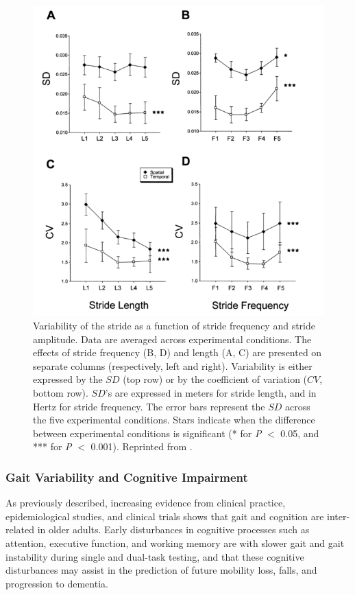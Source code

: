 \documentclass[11pt, oneside]{report}
\begin{document}
\begin{figure}[H]
  \centering
    \includegraphics[scale=0.7]{temp_spat_variability}
  \caption{Variability of the stride as a function of stride frequency and stride amplitude. Data are averaged across experimental conditions. The effects of stride frequency (B, D) and length (A, C) are presented on separate columns (respectively, left and right). Variability is either expressed by the $SD$ (top row) or by the coefficient of variation ($CV$, bottom row). $SD$'s are expressed in meters for stride length, and in Hertz for stride frequency. The error bars represent the $SD$ across the five experimental conditions. Stars indicate when the difference between experimental conditions is significant (* for \textit{P} $<$ 0.05, and *** for \textit{P} $<$ 0.001). Reprinted from \cite{Danion2003}.}
  \label{fig:temp_spat_variability}
\end{figure}

\subsubsection{Gait Variability and Cognitive Impairment}
\label{sec:var_and_cog}

As previously described, increasing evidence from clinical practice, epidemiological studies, and clinical trials shows that gait and cognition are inter-related in older adults\cite{Montero-Odasso2013}. Early disturbances in cognitive processes such as attention, executive function, and working memory are with slower gait and gait instability during single and dual-task testing, and that these cognitive disturbances may assist in the prediction of future mobility loss, falls, and progression to dementia\cite{Montero-Odasso2013}. 
\end{document}
